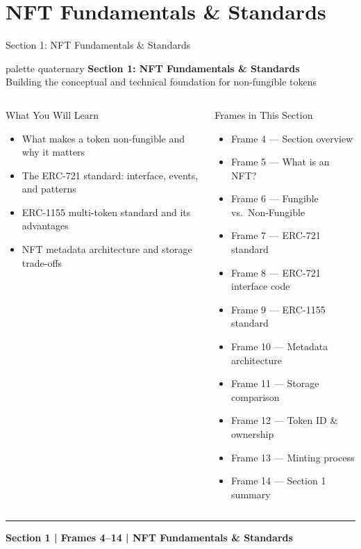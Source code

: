 \documentclass[8pt,aspectratio=169]{beamer}
\newcommand{\bottomnote}[1]{\vfill\vspace{-2mm}\textcolor{mllavender2}{\rule{\textwidth}{0.4pt}}\vspace{1mm}\footnotesize\textbf{#1}}
\begin{document}
\section{NFT Fundamentals \& Standards}

\begin{frame}{Section 1: NFT Fundamentals \& Standards}
\begin{beamercolorbox}[sep=12pt,center,rounded=true,shadow=true]{palette quaternary}
  {\Large\bfseries Section 1: NFT Fundamentals \& Standards}\\[4pt]
  {\normalsize Building the conceptual and technical foundation for non-fungible tokens}
\end{beamercolorbox}

\vspace{4mm}
\begin{columns}[T]
\begin{block}{What You Will Learn}
\begin{itemize}\setlength{\itemsep}{2pt}
  \item What makes a token non-fungible and why it matters
  \item The ERC-721 standard: interface, events, and patterns
  \item ERC-1155 multi-token standard and its advantages
  \item NFT metadata architecture and storage trade-offs
\end{itemize}
\end{block}
\begin{block}{Frames in This Section}
\begin{itemize}\setlength{\itemsep}{1pt}
  \item Frame 4 --- Section overview
  \item Frame 5 --- What is an NFT?
  \item Frame 6 --- Fungible vs.\ Non-Fungible
  \item Frame 7 --- ERC-721 standard
  \item Frame 8 --- ERC-721 interface code
  \item Frame 9 --- ERC-1155 standard
  \item Frame 10 --- Metadata architecture
  \item Frame 11 --- Storage comparison
  \item Frame 12 --- Token ID \& ownership
  \item Frame 13 --- Minting process
  \item Frame 14 --- Section 1 summary
\end{itemize}
\end{block}
\end{columns}
\bottomnote{Section 1 | Frames 4--14 | NFT Fundamentals \& Standards}
\end{frame}
\end{document}
